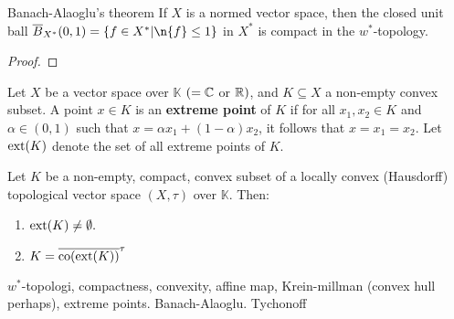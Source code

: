 \documentclass[../../main.tex]{subfiles}
\begin{document}


\begin{theorem}{Banach-Alaoglu's theorem}
If $X$ is a normed vector space, then the closed unit ball $\overline{B}_{X^{*}}(0,1)=\{f\in X^{*} | \n{f}\le 1\}$ in $X^{*}$ is compact in the $w^{*}$-topology.
\end{theorem}
\begin{proof}

\end{proof}




\begin{definition}
Let $X$ be a vector space over $\mathbb{K}$ $(=\mathbb{C}$ or $\mathbb{R})$, and $K\subseteq X$ a non-empty convex subset. A point $x \in K$ is an \textbf{extreme point} of $K$ if for all $x_{1},x_{2}\in K$ and $\alpha \in (0,1)$ such that $x=\alpha x_{1} + (1-\alpha) x_{2}$, it follows that $x=x_{1}=x_{2}$. Let $\operatorname{ext}(K)$ denote the set of all extreme points of $K$.
\end{definition}



\begin{theorem}
Let $K$ be a non-empty, compact, convex subset of a locally convex (Hausdorff) topological vector space $(X, \tau)$ over $\mathbb{K}$. Then:
\begin{enumerate}
\item $\operatorname{ext}(K) \neq \emptyset.$
\item $K = \overline{ \operatorname{co}( \operatorname{ext}( K ) ) }^{\tau}$
\end{enumerate}
\end{theorem}




$w^{*}$-topologi, compactness, convexity, affine map, Krein-millman (convex hull perhaps), extreme points. Banach-Alaoglu. Tychonoff
\end{document}
